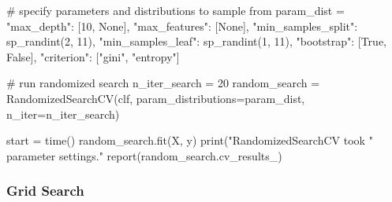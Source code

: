 \documentclass[11pt]{article}
\begin{document}
# specify parameters and distributions to sample from
param_dist = {
              "max_depth": [10, None],
              "max_features": [None],
              "min_samples_split": sp_randint(2, 11),
              "min_samples_leaf": sp_randint(1, 11),
              "bootstrap": [True, False],
              "criterion": ["gini", "entropy"]}

# run randomized search
n_iter_search = 20
random_search = RandomizedSearchCV(clf, param_distributions=param_dist,
                                   n_iter=n_iter_search)

start = time()
random_search.fit(X, y)
print("RandomizedSearchCV took %
      " parameter settings." %
report(random_search.cv_results_)
    \subsubsection{Grid Search}\label{grid-search}
\end{document}
